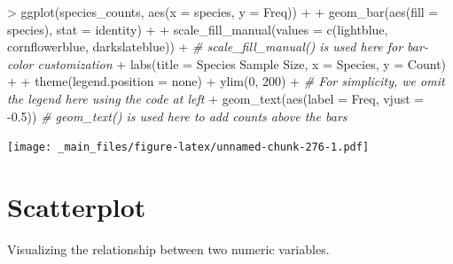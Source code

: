 \documentclass[
]{book}
\newenvironment{Shaded}{\begin{snugshade}}{\end{snugshade}}
\newcommand{\AttributeTok}[1]{\textcolor[rgb]{0.77,0.63,0.00}{#1}}
\newcommand{\CommentTok}[1]{\textcolor[rgb]{0.56,0.35,0.01}{\textit{#1}}}
\newcommand{\DecValTok}[1]{\textcolor[rgb]{0.00,0.00,0.81}{#1}}
\newcommand{\FloatTok}[1]{\textcolor[rgb]{0.00,0.00,0.81}{#1}}
\newcommand{\FunctionTok}[1]{\textcolor[rgb]{0.00,0.00,0.00}{#1}}
\newcommand{\NormalTok}[1]{#1}
\newcommand{\SpecialCharTok}[1]{\textcolor[rgb]{0.00,0.00,0.00}{#1}}
\newcommand{\StringTok}[1]{\textcolor[rgb]{0.31,0.60,0.02}{#1}}
\begin{document}
\begin{Shaded}
\begin{Highlighting}[]
\SpecialCharTok{\textgreater{}} \FunctionTok{ggplot}\NormalTok{(species\_counts, }\FunctionTok{aes}\NormalTok{(}\AttributeTok{x =}\NormalTok{ species, }\AttributeTok{y =}\NormalTok{ Freq)) }\SpecialCharTok{+}
\SpecialCharTok{+}   \FunctionTok{geom\_bar}\NormalTok{(}\FunctionTok{aes}\NormalTok{(}\AttributeTok{fill =}\NormalTok{ species), }\AttributeTok{stat =} \StringTok{\textquotesingle{}identity\textquotesingle{}}\NormalTok{) }\SpecialCharTok{+}
\SpecialCharTok{+}   \FunctionTok{scale\_fill\_manual}\NormalTok{(}\AttributeTok{values =} \FunctionTok{c}\NormalTok{(}\StringTok{\textquotesingle{}lightblue\textquotesingle{}}\NormalTok{, }\StringTok{\textquotesingle{}cornflowerblue\textquotesingle{}}\NormalTok{, }\StringTok{\textquotesingle{}darkslateblue\textquotesingle{}}\NormalTok{)) }\SpecialCharTok{+} \CommentTok{\# scale\_fill\_manual() is used here for bar{-}color customization}
\SpecialCharTok{+}   \FunctionTok{labs}\NormalTok{(}\AttributeTok{title =} \StringTok{\textquotesingle{}Species Sample Size\textquotesingle{}}\NormalTok{, }\AttributeTok{x =} \StringTok{\textquotesingle{}Species\textquotesingle{}}\NormalTok{, }\AttributeTok{y =} \StringTok{\textquotesingle{}Count\textquotesingle{}}\NormalTok{) }\SpecialCharTok{+}
\SpecialCharTok{+}   \FunctionTok{theme}\NormalTok{(}\AttributeTok{legend.position =} \StringTok{\textquotesingle{}none\textquotesingle{}}\NormalTok{) }\SpecialCharTok{+} \FunctionTok{ylim}\NormalTok{(}\DecValTok{0}\NormalTok{, }\DecValTok{200}\NormalTok{) }\SpecialCharTok{+} \CommentTok{\# For simplicity, we omit the legend here using the code at left}
\SpecialCharTok{+}   \FunctionTok{geom\_text}\NormalTok{(}\FunctionTok{aes}\NormalTok{(}\AttributeTok{label =}\NormalTok{ Freq, }\AttributeTok{vjust =} \SpecialCharTok{{-}}\FloatTok{0.5}\NormalTok{)) }\CommentTok{\# geom\_text() is used here to add counts above the bars}
\end{Highlighting}
\end{Shaded}

\texttt{[image: \_main\_files/figure-latex/unnamed-chunk-276-1.pdf]}

\hypertarget{scatterplot}{%
\section{Scatterplot}\label{scatterplot}}

Visualizing the relationship between two numeric variables.
\end{document}
